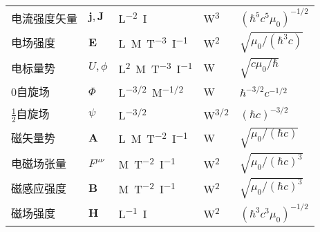 \begin{longtable}{|*5{l|}}
    电流强度矢量 & $\boldsymbol{j,J}$     &   \si{L^{-2}I}        &  \si{W^{3}} & $(\hbar^5 c^5 \mu_0)^{-1/2}$ \\
    电场强度 &  $\boldsymbol{E}$   &   \si{L^{}M^{}T^{-3}I^{-1}}    &  \si{W^{2}} & $\sqrt{\mu_0 /(\hbar^3c)}$  \\
    电标量势 & $U,\phi$  &   \si{L^{2}M^{}T^{-3}I^{-1}}       &   \si{W}&  $\sqrt{c\mu_0 /\hbar}$\\
    $0$自旋场& $\Phi$ & \si{L^{-3/2}M^{-1/2}} & \si{W} & $\hbar^{-3/2} c^{-1/2}$ \\
    $\frac{1}{2}$自旋场& $\psi$ & \si{L^{-3/2}} & \si{W^{3/2}} & $(\hbar c)^{-3/2} $ \\
    磁矢量势 & $\boldsymbol{A}$     &   \si{L^{}M^{}T^{-2}I^{-1}}      &  \si{W^{}} &  $\sqrt{ \mu_0/(\hbar c)}$ \\
    电磁场张量 & $F^{\mu\nu}$ &   \si{M^{}T^{-2}I^{-1}}      &  \si{W^{2}} &  $\sqrt{ \mu_0/(\hbar c)^3}$   \\
    磁感应强度 & $\boldsymbol{B}$     &   \si{M^{}T^{-2}I^{-1}}      &  \si{W^{2}}&  $\sqrt{ \mu_0/(\hbar c)^3}$ \\
    磁场强度 & $\boldsymbol{H}$     &   \si{L^{-1}I^{}}        &  \si{W^{2}} & $(\hbar^3 c^3 \mu_0)^{-1/2}$ \\

\end{longtable}
